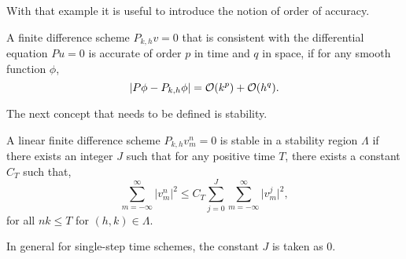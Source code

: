 With that example it is useful to introduce the notion of order of accuracy. 
\begin{definition}
A finite difference scheme $P_{k,h}v=0$ that is consistent with the differential equation $Pu=0$ is accurate of order $p$ in time and $q$ in space, if  for any smooth function $\phi$,
$$ \lvert P\phi-P_{k,h}\phi\rvert=\mathcal{O}(k^p)+\mathcal{O}(h^q). $$
\end{definition}
The next concept that needs to be defined is stability.
\begin{definition}
A linear finite difference scheme $P_{k,h}v_m^n=0$ is stable in a stability region $\Lambda$ if there exists an integer $J$ such that for any positive time $T$, there exists a constant $C_T$ such that,
\begin{equation}
\sum_{m=-\infty}^{\infty} \lvert v_m^n\rvert^2 \leq C_T \sum_{j=0}^J\sum_{m=-\infty}^{\infty}\lvert v_m^j\rvert^2,
\end{equation} 
for all $nk\leq T$ for $(h,k)\in \Lambda$.
\end{definition}
In general for single-step time schemes, the constant $J$ is taken as $0$.

